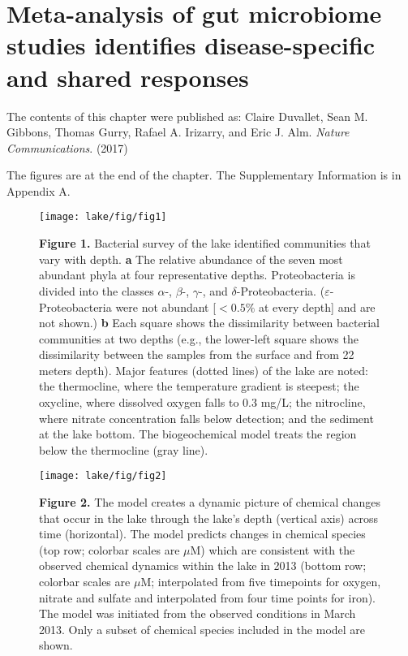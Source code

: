 
\chapter{Meta-analysis of gut microbiome studies identifies disease-specific and shared responses}
\label{ch:lake}

The contents of this chapter were published as:
Claire Duvallet, Sean M. Gibbons, Thomas Gurry, Rafael A. Irizarry, and Eric J. Alm. \textit{Nature Communications}. (2017)

The figures are at the end of the chapter. The Supplementary Information is in Appendix A.



\begin{figure}[ht]
\centering
\texttt{[image: lake/fig/fig1]}
\caption*{{\bf Figure 1.} Bacterial survey of the lake identified communities
that vary with depth. {\bf a} The relative abundance of the seven most abundant phyla
at four representative depths. Proteobacteria is divided into the classes $\alpha$-,
$\beta$-, $\gamma$-, and $\delta$-Proteobacteria. ($\varepsilon$-Proteobacteria were
not abundant [$< 0.5\%$ at
every depth] and are not shown.) {\bf b} Each square shows the dissimilarity between
bacterial communities at two depths (e.g., the lower-left square shows the
dissimilarity between the samples from the surface and from 22 meters depth).
Major features (dotted lines) of the lake are noted: the thermocline, where the
temperature gradient is steepest; the oxycline, where dissolved oxygen falls to
0.3 mg/L; the nitrocline, where nitrate concentration falls below detection;
and the sediment at the lake bottom. The biogeochemical model treats the region
below the thermocline (gray line).}
\end{figure}

\begin{figure}[ht]
\centering
\texttt{[image: lake/fig/fig2]}
\caption*{{\bf Figure 2.} The model creates a dynamic picture of chemical
changes that occur in the lake through the lake's depth (vertical axis) across
time (horizontal). The model predicts changes in chemical species (top row;
colorbar scales are $\mu$M) which are consistent with the observed chemical
dynamics within the lake in 2013 (bottom row; colorbar scales are $\mu$M;
interpolated from five timepoints for oxygen, nitrate and sulfate and
interpolated from four time points for iron). The model was initiated from the
observed conditions in March 2013. Only a subset of chemical species included
in the model are shown.}
\end{figure}

